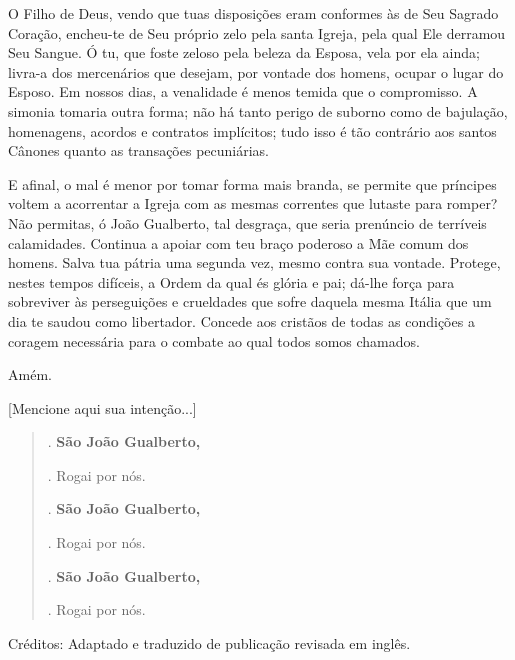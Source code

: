 \documentclass[18pt]{letter}
\makeatletter
\newcommand{\vers@resp@sym}{%
  \raisebox{0.2ex}{\rotatebox[origin=c]{-20}{$\m@th\rceil$}}%
}
\newcommand{\vers@resp}[2]{%
  {\ooalign{%
     \hidewidth\kern#1\vers@resp@sym\hidewidth\cr
     #2\cr
  }}%
}
\DeclareRobustCommand{\versicle}{\vers@resp{-0.1em}{V}}
\DeclareRobustCommand{\response}{\vers@resp{0pt}{R}}
\makeatother
\begin{document}
\begin{justify}
O Filho de Deus, vendo que tuas disposições eram conformes às de Seu Sagrado Coração, encheu-te de Seu próprio zelo pela santa Igreja, pela qual Ele derramou Seu Sangue. Ó tu, que foste zeloso pela beleza da Esposa, vela por ela ainda; livra-a dos mercenários que desejam, por vontade dos homens, ocupar o lugar do Esposo. Em nossos dias, a venalidade é menos temida que o compromisso. A simonia tomaria outra forma; não há tanto perigo de suborno como de bajulação, homenagens, acordos e contratos implícitos; tudo isso é tão contrário aos santos Cânones quanto as transações pecuniárias.

E afinal, o mal é menor por tomar forma mais branda, se permite que príncipes voltem a acorrentar a Igreja com as mesmas correntes que lutaste para romper? Não permitas, ó João Gualberto, tal desgraça, que seria prenúncio de terríveis calamidades. Continua a apoiar com teu braço poderoso a Mãe comum dos homens. Salva tua pátria uma segunda vez, mesmo contra sua vontade. Protege, nestes tempos difíceis, a Ordem da qual és glória e pai; dá-lhe força para sobreviver às perseguições e crueldades que sofre daquela mesma Itália que um dia te saudou como libertador. Concede aos cristãos de todas as condições a coragem necessária para o combate ao qual todos somos chamados.

Amém.

[Mencione aqui sua intenção...]

\begin{verse}

\versicle. \quad \textbf{São João Gualberto,}\par
\response. \quad Rogai por nós.

\versicle. \quad \textbf{São João Gualberto,}\par
\response. \quad Rogai por nós.

\versicle. \quad \textbf{São João Gualberto,}\par
\response. \quad Rogai por nós.

\end{verse}

\end{justify}

\vfill

Créditos: Adaptado e traduzido de publicação revisada em inglês.
\end{document}
